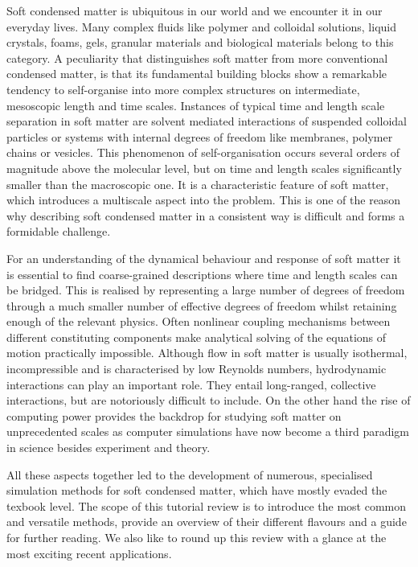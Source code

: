 \documentclass[8.5pt,twoside,twocolumn]{article}
\begin{document}
Soft condensed matter \cite{Doi:2013, Terentjev:2015} is ubiquitous in our world and we 
encounter it in our everyday lives. Many complex fluids like polymer and colloidal solutions, 
liquid crystals, foams, gels, granular materials 
and biological materials belong to this category. A peculiarity that distinguishes soft matter from
 more conventional condensed matter, is that its fundamental building blocks show a 
remarkable tendency 
to self-organise into more complex structures on intermediate, mesoscopic length and time scales. 
Instances of typical time and length scale separation in soft matter are solvent mediated 
interactions of suspended colloidal particles or systems with internal degrees of freedom 
like membranes, polymer chains or vesicles. This phenomenon of self-organisation 
occurs several orders of magnitude above the molecular level, 
but on time and length scales significantly smaller than the macroscopic one.
It is a characteristic feature of soft matter, which introduces a multiscale aspect 
into the problem. This is one of the reason why describing soft condensed matter 
in a consistent way is difficult and forms a formidable challenge. 

For an understanding of the dynamical behaviour and response of soft matter it is 
essential to find coarse-grained descriptions where time and length scales can be bridged.
This is realised by representing a large number of degrees of freedom through a much 
smaller number of effective degrees of freedom whilst retaining enough of the relevant physics. 
Often nonlinear coupling mechanisms between different constituting components 
make analytical solving of the equations of motion practically impossible. 
Although flow in soft matter is usually isothermal, incompressible and is characterised
by low Reynolds numbers, hydrodynamic interactions can play an important role.
They entail long-ranged, collective interactions, but are notoriously difficult to include. 
On the other hand the rise of computing power provides the backdrop for studying soft matter 
on unprecedented scales as computer simulations have now become a third paradigm 
in science besides experiment and theory.

All these aspects together led to the development of numerous, specialised 
simulation methods for soft condensed matter, which have mostly evaded the texbook level.
The scope of this tutorial review is to introduce the most common and versatile methods,
provide an overview of their different flavours and a guide for further reading. We also like to 
round up this review with a glance at the most exciting recent applications.
\end{document}
